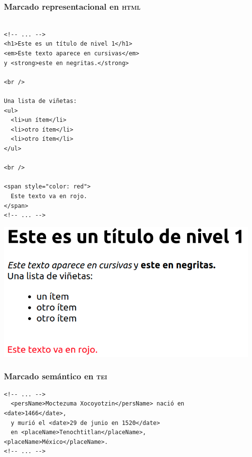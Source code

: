 \documentclass[%
  handout, %
  ]{beamer}
\newcommand*{\TEI}{\textsc{tei}}
\begin{document}


\begin{frame}[fragile]
  \frametitle{Marcado representacional en \textsc{html}}

  \begin{minipage}[c]{0.5\linewidth}
\scriptsize
\begin{verbatim}
  
<!-- ... -->  
<h1>Este es un título de nivel 1</h1>
<em>Este texto aparece en cursivas</em>
y <strong>este en negritas.</strong>

<br />

Una lista de viñetas:
<ul>
  <li>un ítem</li>
  <li>otro ítem</li>
  <li>otro ítem</li>
</ul>

<br />

<span style="color: red">
  Este texto va en rojo.
</span>
<!-- ... --> 
    \end{verbatim}
  \end{minipage}%
  \begin{minipage}[t][\textwidth][t]{0.5\linewidth}
    \includegraphics[width=\textwidth]{img/html.png}
  \end{minipage}
    
\end{frame}


\begin{frame}[fragile]
  \frametitle{Marcado semántico en \TEI}

  \begin{verbatim}
<!-- ... --> 
  <persName>Moctezuma Xocoyotzin</persName> nació en <date>1466</date>, 
  y murió el <date>29 de junio en 1520</date>
  en <placeName>Tenochtitlan</placeName>, <placeName>México</placeName>.
<!-- ... --> 
\end{verbatim}
  
\end{frame}
\end{document}
